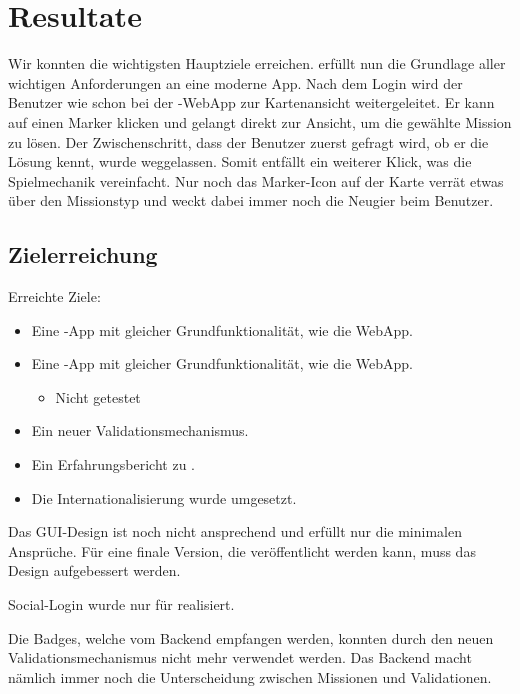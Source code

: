 \chapter{Resultate}
\label{tb-resultate}

Wir konnten die wichtigsten Hauptziele erreichen.
\kort{} erfüllt nun die Grundlage aller wichtigen Anforderungen an eine moderne App.
Nach dem Login wird der Benutzer wie schon bei der \kort{}-\gls{WebApp} zur Kartenansicht weitergeleitet.
Er kann auf einen Marker klicken und gelangt direkt zur Ansicht, um die gewählte Mission zu lösen.
Der Zwischenschritt, dass der Benutzer zuerst gefragt wird, ob er die Lösung kennt, wurde weggelassen.
Somit entfällt ein weiterer Klick, was die Spielmechanik vereinfacht.
Nur noch das Marker-Icon auf der Karte verrät etwas über den Missionstyp und weckt dabei immer noch die Neugier beim Benutzer.


\section{Zielerreichung}

Erreichte Ziele:
\begin{itemize}
	\item Eine -App mit gleicher Grundfunktionalität, wie die \gls{WebApp}.
	\item Eine -App mit gleicher Grundfunktionalität, wie die \gls{WebApp}.
	\begin{itemize}
		\item Nicht getestet
	\end{itemize}
	\item Ein neuer Validationsmechanismus.
	\item Ein Erfahrungsbericht zu .
	\item Die Internationalisierung wurde umgesetzt.
\end{itemize}

Das GUI-Design ist noch nicht ansprechend und erfüllt nur die minimalen Ansprüche.
Für eine finale Version, die veröffentlicht werden kann, muss das Design aufgebessert werden. 

Social-Login wurde nur für  realisiert.

Die Badges, welche vom Backend empfangen werden, konnten durch den neuen Validationsmechanismus nicht mehr verwendet werden.
Das Backend macht nämlich immer noch die Unterscheidung zwischen Missionen und Validationen.

